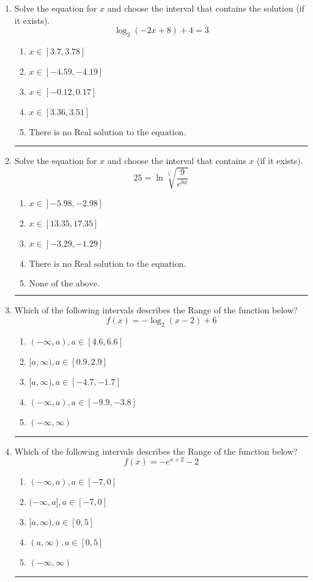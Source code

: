 \documentclass[14pt]{extbook}
\newcommand{\litem}[1]{\item#1\hspace*{-1cm}\rule{\textwidth}{0.4pt}}
\begin{document}
\begin{enumerate}
{\begin{enumerate}[label=\Alph*.]
\end{enumerate} }
\litem{
Solve the equation for $x$ and choose the interval that contains the solution (if it exists).\[ \log_{2}{(-2x+8)}+4 = 3 \]\begin{enumerate}[label=\Alph*.]
\item \( x \in [3.7, 3.78] \)
\item \( x \in [-4.59, -4.19] \)
\item \( x \in [-0.12, 0.17] \)
\item \( x \in [3.36, 3.51] \)
\item \( \text{There is no Real solution to the equation.} \)

\end{enumerate} }
\litem{
 Solve the equation for $x$ and choose the interval that contains $x$ (if it exists).\[  25 = \ln{\sqrt[5]{\frac{9}{e^{8x}}}} \]\begin{enumerate}[label=\Alph*.]
\item \( x \in [-5.98, -2.98] \)
\item \( x \in [13.35, 17.35] \)
\item \( x \in [-3.29, -1.29] \)
\item \( \text{There is no Real solution to the equation.} \)
\item \( \text{None of the above.} \)

\end{enumerate} }
\litem{
Which of the following intervals describes the Range of the function below?\[ f(x) = -\log_2{(x-2)}+6 \]\begin{enumerate}[label=\Alph*.]
\item \( (-\infty, a), a \in [4.6, 6.6] \)
\item \( [a, \infty), a \in [0.9, 2.9] \)
\item \( [a, \infty), a \in [-4.7, -1.7] \)
\item \( (-\infty, a), a \in [-9.9, -3.8] \)
\item \( (-\infty, \infty) \)

\end{enumerate} }
\litem{
Which of the following intervals describes the Range of the function below?\[ f(x) = -e^{x+2}-2 \]\begin{enumerate}[label=\Alph*.]
\item \( (-\infty, a), a \in [-7, 0] \)
\item \( (-\infty, a], a \in [-7, 0] \)
\item \( [a, \infty), a \in [0, 5] \)
\item \( (a, \infty), a \in [0, 5] \)
\item \( (-\infty, \infty) \)


\end{enumerate}}
\end{enumerate}
\end{document}

